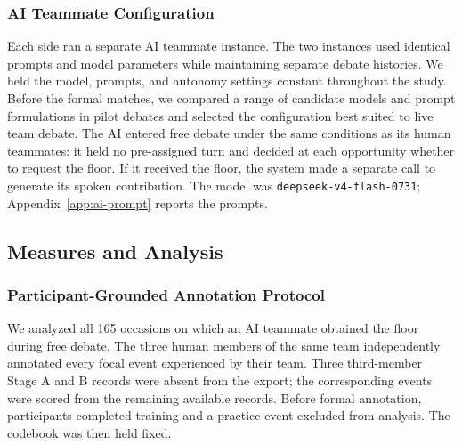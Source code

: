 \documentclass[manuscript,review,anonymous]{acmart}
\begin{document}
\subsubsection{AI Teammate Configuration}

Each side ran a separate AI teammate instance. The two instances used identical prompts and model parameters while maintaining separate debate histories. We held the model, prompts, and autonomy settings constant throughout the study. Before the formal matches, we compared a range of candidate models and prompt formulations in pilot debates and selected the configuration best suited to live team debate. The AI entered free debate under the same conditions as its human teammates: it held no pre-assigned turn and decided at each opportunity whether to request the floor. If it received the floor, the system made a separate call to generate its spoken contribution. The model was \texttt{deepseek-v4-flash-0731}; Appendix~\ref{app:ai-prompt} reports the prompts.

\subsection{Measures and Analysis}

\subsubsection{Participant-Grounded Annotation Protocol}

We analyzed all 165 occasions on which an AI teammate obtained the floor during free debate. The three human members of the same team independently annotated every focal event experienced by their team. Three third-member Stage A and B records were absent from the export; the corresponding events were scored from the remaining available records. Before formal annotation, participants completed training and a practice event excluded from analysis. The codebook was then held fixed.
\end{document}
